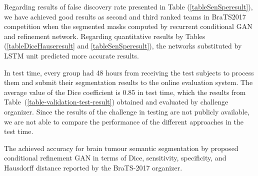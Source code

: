\documentclass[10pt,twocolumn,letterpaper]{article}
\begin{document}
Regarding results of false discovery rate presented in Table (\ref{tableSenSperesult}), we have achieved good results as second and third ranked teams in BraTS2017 competition when the segmented masks computed by recurrent conditional GAN and refinement network.
Regarding quantitative results by Tables (\ref{tableDiceHauseresult} and \ref{tableSenSperesult}), the networks substituted by LSTM unit predicted more accurate results.

In test time, every group had 48 hours from receiving the test subjects to process them and submit their segmentation results to the online evaluation system.
The average value of the Dice coefficient is 0.85 in test time, which the results from Table~(\ref{table-validation-test-result}) obtained and evaluated by challenge organizer. Since the results of the challenge in testing are not publicly available, we are not able to compare the performance of the different approaches in the test time.
\centering
\caption{The achieved accuracy for brain tumour semantic segmentation by proposed conditional refinement GAN in terms of Dice, sensitivity, specificity, and Hausdorff distance reported by the BraTS-2017 organizer.}
\end{document}
